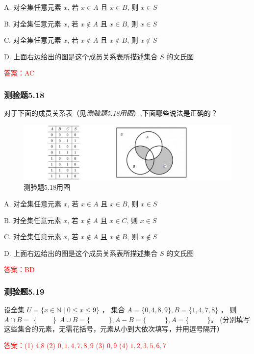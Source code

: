 \documentclass[UTF8, heading=true]{ctexart}
\begin{document}
A. 对全集任意元素 $x$, 若 $x \in A$ 且 $x \in B$, 则 $x \in S$

B. 对全集任意元素 $x$, 若 $x \notin A$ 且 $x \in B$, 则 $x \in S$

C. 对全集任意元素 $x$, 若 $x \notin A$ 且 $x \notin B$, 则 $x \notin S$

D. 上面右边给出的图是这个成员关系表所描述集合 $S$ 的文氏图

\textcolor{red}{答案：AC}


\subsubsection{测验题5.18}
对于下面的成员关系表（见\textit{测验题5.18用图}）,下面哪些说法是正确的？

\begin{figure}[htbp]
  \centering
  \includegraphics[width=1\textwidth]{5.18.jpg} %
  \caption{测验题5.18用图}
\end{figure}

A. 对全集任意元素 $x$, 若 $x \in A$ 且 $x \in B$, 则 $x \in S$

B. 对全集任意元素 $x$, 若 $x \notin A$ 且 $x \in C$, 则 $x \in S$

C. 对全集任意元素 $x$, 若 $x \notin A$ 且 $x \notin B$, 则 $x \notin S$

D. 上面右边给出的图是这个成员关系表所描述集合 $S$ 的文氏图



\textcolor{red}{答案：BD}

\subsubsection{测验题5.19}

设全集 $U=\{x \in \mathbb{N} \mid 0 \leq x \leq 9\}$ ，
集合 $A=\{0,4,8,9\}, B=\{1,4,7,8\}$ ，
则 $A \cap B=$ \{ $\qquad $\} $ \, A \cup B=\{$ $\qquad$ $\}, A-B=\{$ $\qquad$ $\}, \bar{A}=\{$ $\qquad$ \}。 (分别填写这些集合的元素，无需花括号，元素从小到大依次填写，并用逗号隔开）


\textcolor{red}{答案：(1) 4,8
(2) $0,1,4,7,8,9$
(3) $0,9$
(4) $1,2,3,5,6,7$}
\end{document}
